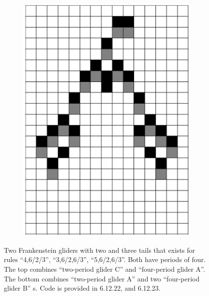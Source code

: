 \documentclass[12pt]{article}
\numberwithin{figure}{section} %
\begin{document}
\begin{figure}[H]
\begin{subfigure}{0.19\textwidth}
     \includegraphics[width=\linewidth]{Section4/26.4}
     \subcaption{}
   \end{subfigure}
   \setcounter{subfigure}{0}
\caption{Two Frankenstein gliders with two and three tails that exists for rules “4,6/2/3”, “3,6/2,6/3”, “5,6/2,6/3”. Both have periods of four. The top combines “two-period glider C” and “four-period glider A”. The bottom combines “two-period glider A” and two “four-period glider B” s. Code is provided in 6.12.22, and 6.12.23. }
\label{fig:frankenstein gliders}
\end{figure}
\end{document}
